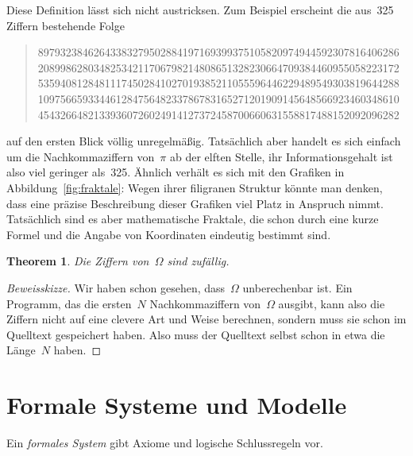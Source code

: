 \documentclass[twoside]{../zirkelblatt1415}
\theoremstyle{definition}
\theoremstyle{plain}
\newtheorem{thm}[defn]{Theorem}
\theoremstyle{remark}
\begin{document}
Diese Definition lässt sich nicht austricksen. Zum Beispiel erscheint die
aus~325 Ziffern bestehende Folge
\begin{quote}
89793238462643383279502884197169399375105820974944592307816406286 \\
20899862803482534211706798214808651328230664709384460955058223172 \\
53594081284811174502841027019385211055596446229489549303819644288 \\
10975665933446128475648233786783165271201909145648566923460348610 \\
45432664821339360726024914127372458700660631558817488152092096282
\end{quote}

auf den ersten Blick völlig unregelmäßig. Tatsächlich aber handelt es sich
einfach um die Nachkommaziffern von~$\pi$ ab der elften Stelle, ihr
Informationsgehalt ist also viel geringer als~325. Ähnlich verhält es sich mit
den Grafiken in Abbildung~\ref{fig:fraktale}: Wegen ihrer filigranen Struktur könnte man denken, dass
eine präzise Beschreibung dieser Grafiken viel Platz in Anspruch nimmt.
Tatsächlich sind es aber mathematische Fraktale, die schon durch eine kurze
Formel und die Angabe von Koordinaten eindeutig bestimmt sind.

\begin{thm}Die Ziffern von~$\Omega$ sind zufällig.\end{thm}
\begin{proof}[Beweisskizze]Wir haben schon gesehen, dass~$\Omega$ unberechenbar
ist. Ein Programm, das die ersten~$N$ Nachkommaziffern von~$\Omega$ ausgibt,
kann also die Ziffern nicht auf eine clevere Art und Weise berechnen, sondern
muss sie schon im Quelltext gespeichert haben. Also muss der Quelltext
selbst schon in etwa die Länge~$N$ haben.
\end{proof}


\section{Formale Systeme und Modelle}

Ein \emph{formales System} gibt Axiome und logische Schlussregeln vor.
\end{document}
